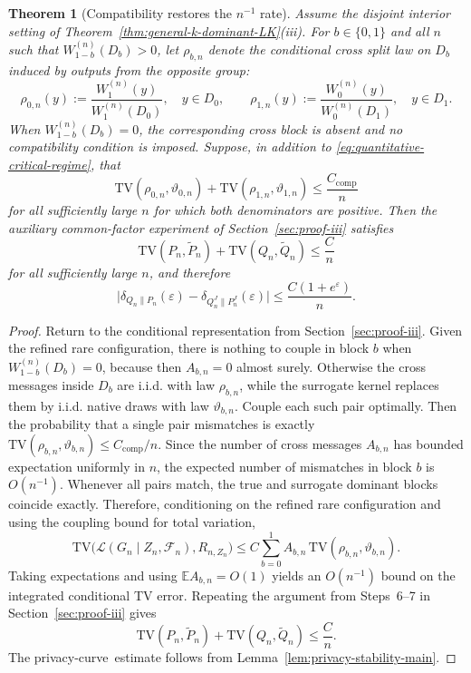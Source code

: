\documentclass{article}
\newtheorem{theorem}{Theorem}[section]
\newcommand{\TV}{\mathrm{TV}}
\newcommand{\E}{\mathbb E}
\newcommand{\1}{\mathbf 1}
\newcommand{\privacycurve}{\mbox{privacy-curve}}
\begin{document}
\begin{theorem}[Compatibility restores the $n^{-1}$ rate]
\label{thm:compatibility-rate}
Assume the disjoint interior setting of Theorem~\ref{thm:general-k-dominant-LK}(iii). For $b\in\{0,1\}$ and
all $n$ such that $W_{1-b}^{(n)}(D_b)>0$, let $\rho_{b,n}$ denote the conditional cross split law on $D_b$
induced by outputs from the opposite group:
\[
\rho_{0,n}(y):=\frac{W_1^{(n)}(y)}{W_1^{(n)}(D_0)},\quad y\in D_0,
\qquad
\rho_{1,n}(y):=\frac{W_0^{(n)}(y)}{W_0^{(n)}(D_1)},\quad y\in D_1.
\]
When $W_{1-b}^{(n)}(D_b)=0$, the corresponding cross block is absent and no compatibility condition is imposed.
Suppose, in addition to \eqref{eq:quantitative-critical-regime}, that
\begin{equation}
\TV(\rho_{0,n},\vartheta_{0,n})+\TV(\rho_{1,n},\vartheta_{1,n})\le \frac{C_{\mathrm{comp}}}{n}
\label{eq:compatibility-condition}
\end{equation}
for all sufficiently large $n$ for which both denominators are positive. Then the auxiliary common-factor experiment
of Section~\ref{sec:proof-iii}
satisfies
\[
\TV(P_n,\widetilde P_n)+\TV(Q_n,\widetilde Q_n)\le \frac{C}{n}
\]
for all sufficiently large $n$, and therefore
\[
\bigl|\delta_{Q_n\|P_n}(\varepsilon)-\delta_{Q_n^J\|P_n^J}(\varepsilon)\bigr|
\le \frac{C(1+e^\varepsilon)}{n}.
\]
\end{theorem}

\begin{proof}
Return to the conditional representation from Section~\ref{sec:proof-iii}. Given the refined rare configuration,
there is nothing to couple in block $b$ when $W_{1-b}^{(n)}(D_b)=0$, because then $A_{b,n}=0$ almost surely.
Otherwise the cross messages inside $D_b$ are i.i.d. with law $\rho_{b,n}$, while the surrogate kernel replaces
them by i.i.d. native draws with law $\vartheta_{b,n}$. Couple each such pair optimally. Then the probability
that a single pair mismatches is exactly $\TV(\rho_{b,n},\vartheta_{b,n})\le C_{\mathrm{comp}}/n$. Since the number
of cross messages $A_{b,n}$ has bounded expectation uniformly in $n$, the expected number of mismatches in block
$b$ is $O(n^{-1})$. Whenever all pairs match, the true and surrogate dominant blocks coincide exactly. Therefore,
conditioning on the refined rare configuration and using the coupling bound for total variation,
\[
\TV\bigl(\mathcal L(G_n\mid Z_n,\mathcal F_n),R_{n,Z_n}\bigr)
\le C\sum_{b=0}^1 A_{b,n}\,\TV(\rho_{b,n},\vartheta_{b,n}).
\]
Taking expectations and using $\E A_{b,n}=O(1)$ yields an $O(n^{-1})$ bound on the integrated conditional TV error.
Repeating the argument from Steps~6--7 in Section~\ref{sec:proof-iii} gives
\[
\TV(P_n,\widetilde P_n)+\TV(Q_n,\widetilde Q_n)\le \frac{C}{n}.
\]
The \privacycurve\ estimate follows from Lemma~\ref{lem:privacy-stability-main}.
\end{proof}
\end{document}
